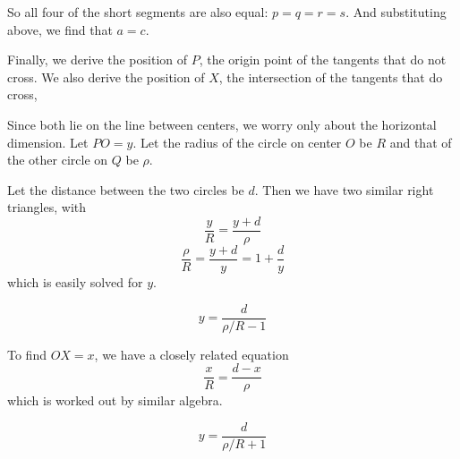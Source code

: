 \documentclass[11pt, oneside]{article}
\begin{document}
So all four of the short segments are also equal:  $p = q = r = s$.  And substituting above, we find that $a = c$.

Finally, we derive the position of $P$, the origin point of the tangents that do not cross.  We also derive the position of $X$, the intersection of the tangents that do cross,

Since both lie on the line between centers, we worry only about the horizontal dimension.  Let $PO = y$.  Let the radius of the circle on center $O$ be $R$ and that of the other circle on $Q$ be $\rho$.

Let the distance between the two circles be $d$.  Then we have two similar right triangles, with
\[ \frac{y}{R} = \frac{y+d}{\rho} \]
\[ \frac{\rho}{R} = \frac{y+d}{y} = 1 + \frac{d}{y} \]
which is easily solved for $y$.

\[ y = \frac{d}{\rho/R - 1} \]

To find $OX = x$, we have a closely related equation 
\[ \frac{x}{R} = \frac{d-x}{\rho} \]
which is worked out by similar algebra.

\[ y = \frac{d}{\rho/R + 1} \]
\end{document}
